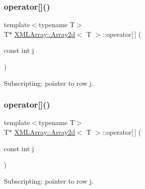 \subsubsection{\texorpdfstring{operator[]()}{operator[]()}\hspace{0.1cm}{\footnotesize\ttfamily [1/6]}}
{\footnotesize\ttfamily template$<$typename T$>$ \\
T$\ast$ \mbox{\hyperlink{classXMLArray_1_1Array2d}{X\+M\+L\+Array\+::\+Array2d}}$<$ T $>$\+::operator\mbox{[}$\,$\mbox{]} (\begin{DoxyParamCaption}\item[{const int}]{j }\end{DoxyParamCaption})\hspace{0.3cm}{\ttfamily [inline]}}



Subscripting\+: pointer to row j. 

\mbox{\label{classXMLArray_1_1Array2d_a1e5b7fa596ec682113700320b08e66d5}} 
\subsubsection{\texorpdfstring{operator[]()}{operator[]()}\hspace{0.1cm}{\footnotesize\ttfamily [2/6]}}
{\footnotesize\ttfamily template$<$typename T$>$ \\
T$\ast$ \mbox{\hyperlink{classXMLArray_1_1Array2d}{X\+M\+L\+Array\+::\+Array2d}}$<$ T $>$\+::operator\mbox{[}$\,$\mbox{]} (\begin{DoxyParamCaption}\item[{const int}]{j }\end{DoxyParamCaption})\hspace{0.3cm}{\ttfamily [inline]}}



Subscripting\+: pointer to row j. 

\mbox{\label{classXMLArray_1_1Array2d_a1e5b7fa596ec682113700320b08e66d5}} 
